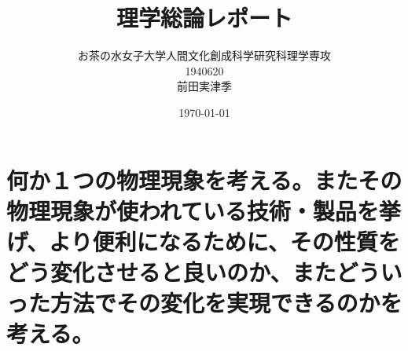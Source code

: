 \documentclass[10pt]{jreport}
\begin{document}
\title{理学総論レポート}

\author{お茶の水女子大学人間文化創成科学研究科理学専攻 \\1940620 \\ 前田実津季}
\date{\today}
\maketitle

\section*{何か１つの物理現象を考える。またその物理現象が使われている技術・製品を挙げ、より便利になるために、その性質をどう変化させると良いのか、またどういった方法でその変化を実現できるのかを考える。}
\end{document}
